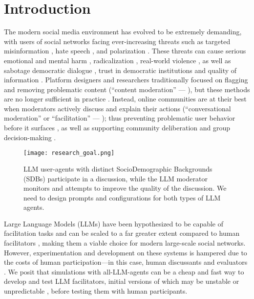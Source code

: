 %
\section{Introduction}
\label{sec:introduction}

The modern social media environment has evolved to be extremely demanding, with users of social networks facing ever-increasing threats such as targeted misinformation \cite{clemons2025disinformation, Denniss2025Social}, hate speech \cite{kolluri2025parler}, and polarization \cite{pranesh2024impactsocialmediapolarization}. These threats can cause serious emotional and mental harm \citep{proactive_moderation}, radicalization \citep{cho-etal-2024-language}, real-world violence \citep{schaffner_community_guidelines}, as well as sabotage democratic dialogue \citep{esau2017design, falk-etal-2021-predicting, seering_self_moderation}, trust in democratic institutions \citep{schroeder-etal-2024-fora} and quality of information \citep{make_reddit_great}. Platform designers and researchers traditionally focused on flagging and removing problematic content (``content moderation'' --- \citet{seering_self_moderation, cresci_pesonalized_interventions}), but these methods are no longer sufficient in practice \cite{horta_automated_moderation, schaffner_community_guidelines, small-polis-llm, korre2025evaluation}. Instead, online communities are at their best when moderators actively discuss and explain their actions (``conversational moderation'' or ``facilitation'' --- \citet{argyle2023, korre2025evaluation, falk-etal-2021-predicting}); thus preventing problematic user behavior before it surfaces \cite{cho-etal-2024-language, seering_self_moderation, cresci_pesonalized_interventions, make_reddit_great}, as well as supporting community deliberation and group decision-making \cite{kim_et_al_chatbot, seering_self_moderation}. 

\begin{figure}[t]
	\centering
	\texttt{[image: research\_goal.png]}
	\caption{LLM user-agents with distinct SocioDemographic Backgrounds (SDBs) participate in a discussion, while the LLM moderator monitors and attempts to improve the quality of the discussion. We need to design prompts and configurations for both types of LLM agents.}
	\label{fig::goals}
\end{figure}

Large Language Models (LLMs) have been hypothesized to be capable of facilitation tasks and can be scaled to a far greater extent compared to human facilitators \cite{korre2025evaluation, small-polis-llm}, making them a viable choice for modern large-scale social networks. However, experimentation and development on these systems is hampered due to the costs of human participation---in this case, human discussants and evaluators \citep{rossi_2024}. We posit that simulations with all-LLM-agents can be a cheap and fast way to develop and test LLM facilitators, initial versions of which may be unstable or unpredictable \cite{atil_2025, rossi_2024}, before testing them with human participants. 

